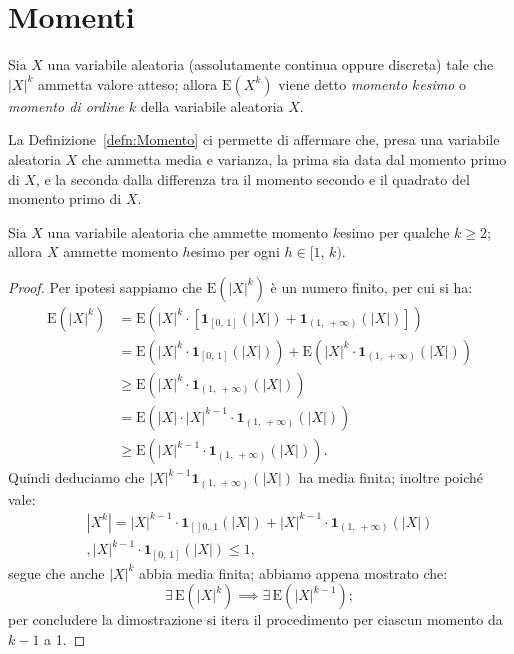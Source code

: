     \section{Momenti}
        \begin{defn}\label{defn:Momento}
            Sia $X$ una variabile aleatoria (assolutamente continua oppure discreta) tale che $|X|^k$ ammetta valore atteso; allora $\text{E}(X^k)$ viene detto \emph{momento $k$\nbdash esimo} o \emph{momento di ordine $k$} della variabile aleatoria $X$.
        \end{defn}
        \begin{obsv}
            La Definizione~\ref{defn:Momento} ci permette di affermare che, presa una variabile aleatoria $X$ che ammetta media e varianza, la prima sia data dal momento primo di $X$, e la seconda dalla differenza tra il momento secondo e il quadrato del  momento primo di $X$.
        \end{obsv}
        \begin{prty}
            Sia $X$ una variabile aleatoria che ammette momento $k$\nbdash esimo per qualche $k \geq 2$; allora $X$ ammette momento $h$\nbdash esimo per ogni $h \in [1,\,k)$.
        \end{prty}
        \begin{proof}
            Per ipotesi sappiamo che $\text{E}(|X|^k)$ è un numero finito, per cui si ha:
            \begin{align*}
                \text{E}(|X|^k) &= \text{E}\left(|X|^k\cdot\left[\mathbf{1}_{[0,\,1]}(|X|) + \mathbf{1}_{(1,\,+\infty)}(|X|)\right]\right) \\
                                &= \text{E}\left(|X|^k\cdot\mathbf{1}_{[0,\,1]}(|X|)\right) + \text{E}\left(|X|^k\cdot\mathbf{1}_{(1,\,+\infty)}(|X|)\right) \\
                                &\geq \text{E}\left(|X|^k\cdot\mathbf{1}_{(1,\,+\infty)}(|X|)\right)\\
                                &= \text{E}\left(|X|\cdot |X|^{k-1}\cdot\mathbf{1}_{(1,\,+\infty)}(|X|)\right) \\
                                &\geq \text{E}\left(|X|^{k-1}\cdot\mathbf{1}_{(1,\,+\infty)}(|X|)\right)
            .\end{align*}
            Quindi deduciamo che $|X|^{k-1}\mathbf{1}_{(1,\,+\infty)}(|X|)$ ha media finita; inoltre poiché vale:
            \begin{gather*}
                |X^k| = |X|^{k-1} \cdot \mathbf{1}_{[]0,\,1} (|X|) + |X|^{k-1}\cdot\mathbf{1}_{(1,\,+\infty)} (|X|) \\,
                |X|^{k-1}\cdot\mathbf{1}_{[0,\,1]} (|X|) \leq 1,
            \end{gather*}
            segue che anche $|X|^k$ abbia media finita; abbiamo appena mostrato che: \[
            \exists\, \text{E}(|X|^k) \implies \exists\, \text{E}(|X|^{k-1})
            ;\] per concludere la dimostrazione si itera il procedimento per ciascun momento da $k-1$ a 1.
        \end{proof}
